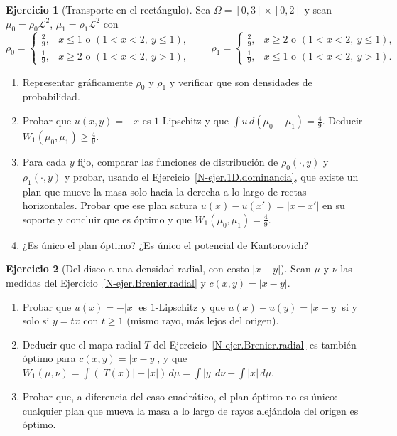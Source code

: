 \documentclass[11pt,a4paper]{amsart}
\newcounter{chapter}
\newcommand{\LL}{{\mathcal L}}
\theoremstyle{remark}
\theoremstyle{definition}
\newtheorem{ejercicio}{Ejercicio}[chapter]
\numberwithin{subsection}{section}
\numberwithin{equation}{section}
\begin{document}
\begin{ejercicio}[Transporte en el rectángulo]\label{ejer.KR.rectangulo}
Sea $\Omega=[0,3]\times[0,2]$ y sean $\mu_0=\rho_0\LL^2$, $\mu_1=\rho_1\LL^2$
con
\[
\rho_0=\begin{cases}\tfrac29,&x\le1\text{ o }(1<x<2,\ y\le1),\\[2pt]
\tfrac19,&x\ge2\text{ o }(1<x<2,\ y>1),\end{cases}
\qquad
\rho_1=\begin{cases}\tfrac29,&x\ge2\text{ o }(1<x<2,\ y\le1),\\[2pt]
\tfrac19,&x\le1\text{ o }(1<x<2,\ y>1).\end{cases}
\]
\begin{enumerate}[label=(\alph*)]
\item Representar gráficamente $\rho_0$ y $\rho_1$ y verificar que son
densidades de probabilidad.
\item Probar que $u(x,y)=-x$ es $1$-Lipschitz y que
$\int u\,d(\mu_0-\mu_1)=\tfrac49$. Deducir $W_1(\mu_0,\mu_1)\ge\tfrac49$.
\item Para cada $y$ fijo, comparar las funciones de distribución de
$\rho_0(\cdot,y)$ y $\rho_1(\cdot,y)$ y probar, usando el
Ejercicio~\ref{N-ejer.1D.dominancia}, que existe un plan que mueve la masa
solo hacia la derecha a lo largo de rectas horizontales. Probar que ese
plan satura $u(x)-u(x')=|x-x'|$ en su soporte y concluir que es óptimo y que
$W_1(\mu_0,\mu_1)=\tfrac49$.
\item ¿Es único el plan óptimo? ¿Es único el potencial de Kantorovich?
\end{enumerate}
\end{ejercicio}

\begin{ejercicio}[Del disco a una densidad radial, con costo $|x-y|$]\label{ejer.KR.radial}
Sean $\mu$ y $\nu$ las medidas del Ejercicio~\ref{N-ejer.Brenier.radial} y
$c(x,y)=|x-y|$.
\begin{enumerate}[label=(\alph*)]
\item Probar que $u(x)=-|x|$ es $1$-Lipschitz y que $u(x)-u(y)=|x-y|$ si y
solo si $y=tx$ con $t\ge1$ (mismo rayo, más lejos del origen).
\item Deducir que el mapa radial $T$ del Ejercicio~\ref{N-ejer.Brenier.radial}
es también óptimo para $c(x,y)=|x-y|$, y que
$W_1(\mu,\nu)=\int(|T(x)|-|x|)\,d\mu=\int|y|\,d\nu-\int|x|\,d\mu$.
\item Probar que, a diferencia del caso cuadrático, el plan óptimo no es
único: cualquier plan que mueva la masa a lo largo de rayos alejándola del
origen es óptimo.
\end{enumerate}
\end{ejercicio}
\end{document}
